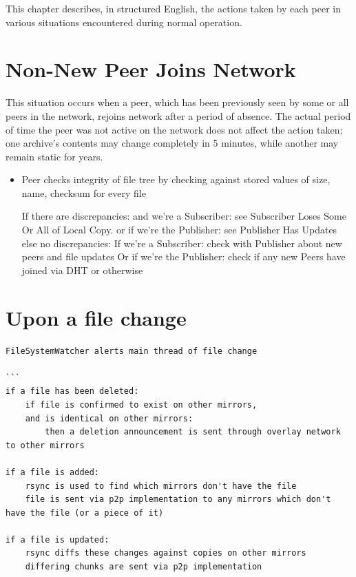 \documentclass[12pt,a4paper,]{adreport}
\begin{document}
This chapter describes, in structured English, the actions taken by each
peer in various situations encountered during normal operation.

\section{Non-New Peer Joins Network}\label{non-new-peer-joins-network}

This situation occurs when a peer, which has been previously seen by
some or all peers in the network, rejoins network after a period of
absence. The actual period of time the peer was not active on the
network does not affect the action taken; one archive's contents may
change completely in 5 minutes, while another may remain static for
years.

\begin{itemize}
\item
  Peer checks integrity of file tree by checking against stored values
  of size, name, checksum for every file

  If there are discrepancies: and we're a Subscriber: see Subscriber
  Loses Some Or All of Local Copy. or if we're the Publisher: see
  Publisher Has Updates else no discrepancies: If we're a Subscriber:
  check with Publisher about new peers and file updates Or if we're the
  Publisher: check if any new Peers have joined via DHT or otherwise
\end{itemize}

\section{Upon a file change}\label{upon-a-file-change}

\begin{verbatim}
FileSystemWatcher alerts main thread of file change

```
if a file has been deleted:
    if file is confirmed to exist on other mirrors,
    and is identical on other mirrors:
        then a deletion announcement is sent through overlay network to other mirrors

if a file is added:
    rsync is used to find which mirrors don't have the file
    file is sent via p2p implementation to any mirrors which don't have the file (or a piece of it)
    
if a file is updated:
    rsync diffs these changes against copies on other mirrors
    differing chunks are sent via p2p implementation
\end{verbatim}
\end{document}
